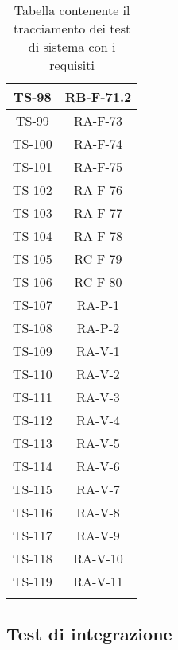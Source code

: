 \begin{center}
\begin{longtable}{|c|c|}
			\hline
			TS-98 & RB-F-71.2 \\
			\hline
			TS-99 & RA-F-73 \\
			\hline
			TS-100 & RA-F-74 \\
			\hline
			TS-101 & RA-F-75 \\
			\hline
			TS-102 & RA-F-76 \\
			\hline
			TS-103 & RA-F-77 \\
			\hline
			TS-104 & RA-F-78 \\
			\hline
			TS-105 & RC-F-79 \\
			\hline
			TS-106 & RC-F-80 \\
			\hline
			TS-107 & RA-P-1 \\
			\hline
			TS-108 & RA-P-2 \\
			\hline
			TS-109 & RA-V-1 \\
			\hline
			TS-110 & RA-V-2 \\
			\hline
			TS-111 & RA-V-3 \\
			\hline
			TS-112 & RA-V-4 \\
			\hline
			TS-113 & RA-V-5 \\
			\hline
			TS-114 & RA-V-6 \\
			\hline
			TS-115 & RA-V-7 \\
			\hline
			TS-116 & RA-V-8 \\
			\hline
			TS-117 & RA-V-9 \\
			\hline
			TS-118 & RA-V-10 \\
			\hline
			TS-119 & RA-V-11 \\
			\hline

			\caption{Tabella contenente il tracciamento dei test di sistema con i requisiti}
			\end{longtable}
		\end{center}

	\subsection{Test di integrazione}

